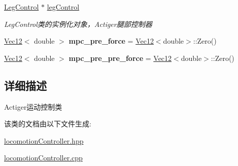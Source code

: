 \begin{DoxyCompactItemize}
\mbox{\label{classquadruped_1_1LocomotionCtrl_a46951dff3fd3eb4b0d050bf831b05a4e}} 
\hyperlink{classquadruped_1_1LegControl}{Leg\+Control} $\ast$ \hyperlink{classquadruped_1_1LocomotionCtrl_a46951dff3fd3eb4b0d050bf831b05a4e}{leg\+Control}
\begin{DoxyCompactList}\small\item\em Leg\+Control类的实例化对象，\+Actiger腿部控制器 \end{DoxyCompactList}\item 
\mbox{\label{classquadruped_1_1LocomotionCtrl_a972cced6a5cac9fbfc8a324cad41c04d}} 
\hyperlink{cppTypes_8h_a87f228860242acc66da2e58086d18cec}{Vec12}$<$ double $>$ {\bfseries mpc\+\_\+pre\+\_\+force} = \hyperlink{cppTypes_8h_a87f228860242acc66da2e58086d18cec}{Vec12}$<$double$>$\+::Zero()
\item 
\mbox{\label{classquadruped_1_1LocomotionCtrl_a8dede580a59c915af67d01f4e82fab42}} 
\hyperlink{cppTypes_8h_a87f228860242acc66da2e58086d18cec}{Vec12}$<$ double $>$ {\bfseries mpc\+\_\+pre\+\_\+pre\+\_\+force} = \hyperlink{cppTypes_8h_a87f228860242acc66da2e58086d18cec}{Vec12}$<$double$>$\+::Zero()
\end{DoxyCompactItemize}


\subsection{详细描述}
Actiger运动控制类 

该类的文档由以下文件生成\+:\begin{DoxyCompactItemize}
\item 
\hyperlink{locomotionController_8hpp}{locomotion\+Controller.\+hpp}\item 
\hyperlink{locomotionController_8cpp}{locomotion\+Controller.\+cpp}\end{DoxyCompactItemize}
